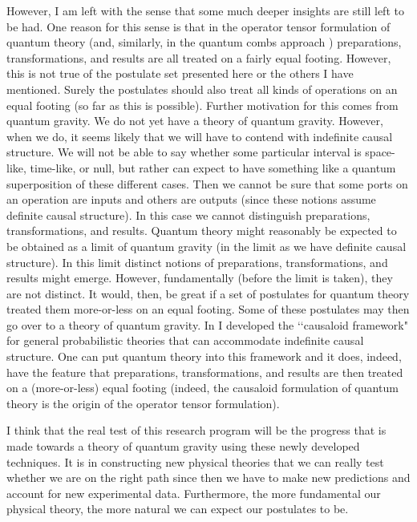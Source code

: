 \documentclass[10pt]{article}
\begin{document}
However, I am left with the sense that some much deeper insights are still left to be had.  One reason for this sense is that in the operator tensor formulation \cite{hardy2011reformulating, hardy2012operator} of quantum theory (and, similarly, in the quantum combs approach \cite{chiribella2009theoretical}) preparations, transformations, and results are all treated on a fairly equal footing. However, this is not true of the postulate set presented here or the others I have mentioned.  Surely the postulates should also treat all kinds of operations on an  equal footing (so far as this is possible).  Further motivation for this comes from quantum gravity.  We do not yet have a theory of quantum gravity. However, when we do, it seems likely that we will have to contend with indefinite causal structure.  We will not be able to say whether some particular interval is space-like, time-like, or null, but rather can expect to have something like a quantum superposition of these different cases.  Then we cannot be sure that some ports on an operation are inputs and others are outputs (since these notions assume definite causal structure).  In this case we cannot distinguish preparations, transformations, and results.  Quantum theory might reasonably be expected to be obtained as a limit of quantum gravity (in the limit as we have definite causal structure).  In this limit distinct notions of preparations, transformations, and results might emerge. However, fundamentally (before the limit is taken), they are not distinct.  It would, then, be great if a set of postulates for quantum theory treated them more-or-less on an equal footing. Some of these postulates may then go over to a theory of quantum gravity. In \cite{hardy2005probability, hardy2007towards, hardy2009quantum3} I developed the \lq\lq causaloid framework" for general probabilistic theories that can accommodate indefinite causal structure.  One can put quantum theory into this framework and it does, indeed, have the feature that preparations, transformations, and results are then treated on a (more-or-less) equal footing (indeed, the causaloid formulation of quantum theory is the origin of the operator tensor formulation).

I think that the real test of this research program will be the progress that is made towards a theory of quantum gravity using these newly developed techniques.  It is in constructing new physical theories that we can really test whether we are on the right path since then we have to make new predictions and account for new experimental data.  Furthermore, the more fundamental our physical theory, the more natural we can expect our postulates to be.  
\end{document}
